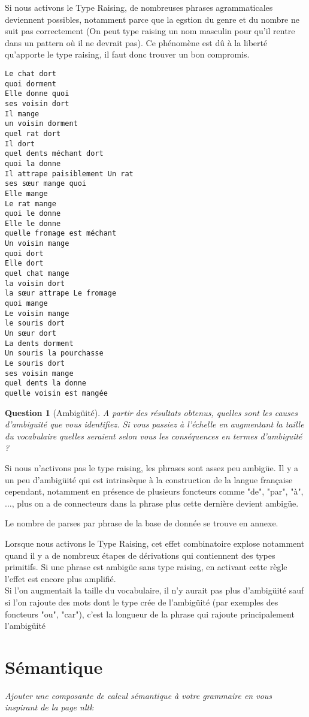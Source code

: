 \documentclass[12pt]{article}
\theoremstyle{exostyle}
\newtheorem{exo}{Question}[section]
\begin{document}
Si nous activons le Type Raising, de nombreuses phrases agrammaticales deviennent possibles, notamment parce que la egstion du genre et du nombre ne suit pas correctement (On peut type raising un nom masculin pour qu'il rentre dans un pattern où il ne devrait pas). Ce phénomène est dû à la liberté qu'apporte le type raising, il faut donc trouver un bon compromis.
\begin{verbatim}
Le chat dort
quoi dorment
Elle donne quoi
ses voisin dort
Il mange
un voisin dorment
quel rat dort
Il dort
quel dents méchant dort
quoi la donne
Il attrape paisiblement Un rat
ses sœur mange quoi
Elle mange
Le rat mange
quoi le donne
Elle le donne
quelle fromage est méchant
Un voisin mange
quoi dort
Elle dort
quel chat mange
la voisin dort
la sœur attrape Le fromage
quoi mange
Le voisin mange
le souris dort
Un sœur dort
La dents dorment
Un souris la pourchasse
Le souris dort
ses voisin mange
quel dents la donne
quelle voisin est mangée
\end{verbatim}

\begin{exo}[Ambigüité]
\textit{A partir des résultats obtenus, quelles sont les causes d’ambiguité que vous
identifiez. Si vous passiez à l’échelle en augmentant la taille du vocabulaire
quelles seraient selon vous les conséquences en termes d’ambiguité ?}
\end{exo}

Si nous n'activons pas le type raising, les phrases sont assez peu ambigüe. Il y a un peu d'ambigüité qui est intrinsèque à la construction de la langue française cependant, notamment en présence de plusieurs foncteurs comme "de", "par", "à", ..., plus on a de connecteurs dans la phrase plus cette dernière devient ambigüe.

Le nombre de parses par phrase de la base de donnée se trouve en annexe.

Lorsque nous activons le Type Raising, cet effet combinatoire explose notamment quand il y a de nombreux étapes de dérivations qui contiennent des types primitifs. Si une phrase est ambigüe sans type raising, en activant cette règle l'effet est encore plus amplifié.\\
Si l'on augmentait la taille du vocabulaire, il n'y aurait pas plus d'ambigüité sauf si l'on rajoute des mots dont le type crée de l'ambigüité (par exemples des foncteurs "ou", "car"), c'est la longueur de la phrase qui rajoute principalement l'ambigüité 

\section{Sémantique}
\textit{Ajouter une composante de calcul sémantique à votre grammaire en vous inspirant de
la page nltk}
\end{document}

